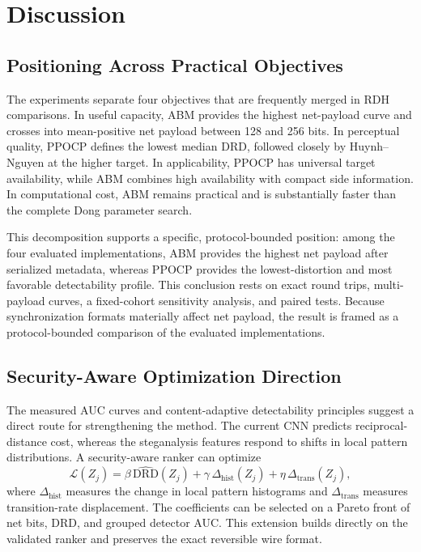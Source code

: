 \documentclass[a4paper,fleqn]{cas-dc}
\begin{document}
\section{Discussion}
\label{sec:discussion}

\subsection{Positioning Across Practical Objectives}

The experiments separate four objectives that are frequently merged in RDH
comparisons. In useful capacity, ABM provides the highest net-payload curve and
crosses into mean-positive net payload between 128 and 256 bits. In
perceptual quality, PPOCP defines the lowest median DRD, followed closely by
Huynh--Nguyen at the higher target. In applicability, PPOCP has universal
target availability, while ABM combines high availability with compact side
information. In computational cost, ABM remains practical and is substantially
faster than the complete Dong parameter search.

This decomposition supports a specific, protocol-bounded position: among the
four evaluated implementations, ABM provides the highest net payload after
serialized metadata, whereas PPOCP provides the lowest-distortion and
most favorable detectability profile. This conclusion rests on exact round trips,
multi-payload curves, a fixed-cohort sensitivity analysis, and paired tests.
Because synchronization formats materially affect net payload, the result is
framed as a protocol-bounded comparison of the evaluated implementations.

\subsection{Security-Aware Optimization Direction}

The measured AUC curves and content-adaptive detectability principles
\cite{Sedighi2018Content} suggest a direct route for strengthening the method.
The current CNN predicts reciprocal-distance cost, whereas the steganalysis
features respond to shifts in local pattern distributions. A security-aware
ranker can optimize
\begin{equation}
\mathcal{L}(Z_j)=
\beta\,\widehat{\mathrm{DRD}}(Z_j)
+\gamma\,\Delta_{\mathrm{hist}}(Z_j)
+\eta\,\Delta_{\mathrm{trans}}(Z_j),
\label{eq:security-aware-ranker}
\end{equation}
where $\Delta_{\mathrm{hist}}$ measures the change in local pattern histograms
and $\Delta_{\mathrm{trans}}$ measures transition-rate displacement. The
coefficients can be selected on a Pareto front of net bits, DRD, and grouped
detector AUC. This extension builds directly on the validated ranker and
preserves the exact reversible wire format.
\end{document}
